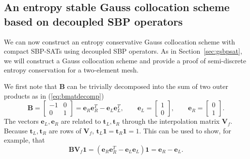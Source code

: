 \documentclass[review,onefignum,onetabnum,final]{siamart171218}
\newcommand{\LRp}[1]{\left( #1 \right)}
\newcommand{\note}[1]{{\color{blue}{#1}}}
\begin{document}
\subsection{An entropy stable Gauss collocation scheme based on decoupled SBP operators}

We can now construct an entropy conservative Gauss collocation scheme with compact SBP-SATs using decoupled SBP operators.  As in Section~\ref{sec:gsbpsat}, we will construct a Gauss collocation scheme and provide a proof of semi-discrete entropy conservation for a two-element mesh.  


We first note that $\bm{B}$ can be trivially decomposed into the sum of two outer products as in (\ref{eq:bmatdecomp})
\begin{equation}
\bm{B} = \begin{bmatrix}
-1 & 0 \\
0 & 1
\end{bmatrix} = \bm{e}_R\bm{e}_R^T - \bm{e}_L\bm{e}_L^T, \qquad \bm{e}_L = \begin{bmatrix} 1\\0\end{bmatrix}, \qquad \bm{e}_R = \begin{bmatrix} 0\\1\end{bmatrix}.
\label{eq:bmatdecomp2}
\end{equation}
The vectors $\bm{e}_L, \bm{e}_R$ are related to $\bm{t}_L, \bm{t}_R$ through the interpolation matrix $\bm{V}_f$.  Because $\bm{t}_L, \bm{t}_R$ are rows of $\bm{V}_f$, $\bm{t}_L\bm{1} = \bm{t}_R\bm{1} = 1$.  This can be used to show, for example, that
\begin{equation}
\label{eq:et}
\bm{B}\bm{V}_f\bm{1} = \LRp{\bm{e}_R\bm{e}_R^T - \bm{e}_L\bm{e}_L}\bm{1} = \bm{e}_R-\bm{e}_L.
\end{equation}
\end{document}
